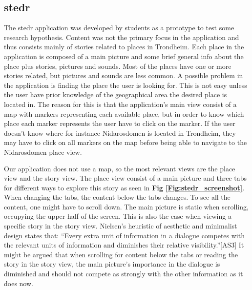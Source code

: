 \subsection{stedr}
\label{subsec:stedr}

The stedr application was developed by students as a prototype to test some research hypothesis. Content was not the primary focus in the application and thus consists mainly of stories related to places in Trondheim. Each place in the application is composed of a main picture and some brief general info about the place plus stories, pictures and sounds. Most of the places have one or more stories related, but pictures and sounds are less common. A possible problem in the application is finding the place the user is looking for. This is not easy unless the user have prior knowledge of the geographical area the desired place is located in. The reason for this is that the application’s main view consist of a map with markers representing each available place, but in order to know which place each marker represents the user have to click on the marker. If the user doesn’t know where for instance Nidarosdomen is located in Trondheim, they may have to click on all markers on the map before being able to navigate to the Nidarosdomen place view. \newline

Our application does not use a map, so the most relevant views are the place view and the story view. The place view consist of a main picture and three tabs for different ways to explore this story as seen in \textbf{Fig \ref{Fig:stedr_screenshot}}. When changing the tabs, the content below the tabs changes. To see all the content, one might have to scroll down. The main picture is static when scrolling, occupying the upper half of the screen. This is also the case when viewing a specific story in the story view. Nielsen’s heuristic of aesthetic and minimalist design states that: “Every extra unit of information in a dialogue competes with the relevant units of information and diminishes their relative visibility.”[AS3] It might be argued that when scrolling for content below the tabs or reading the story in the story view, the main picture’s importance in the dialogue is diminished and should not compete as strongly with the other information as it does now. \newline

